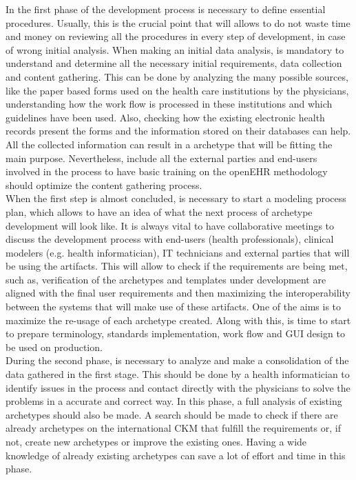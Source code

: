 \documentclass[mim_thesis.tex]{subfiles}
\begin{document}
In the first phase of the development process is necessary to define essential procedures. Usually, this is the crucial point that will allows to do not waste time and money on reviewing all the procedures in every step of development, in case of wrong initial analysis. When making an initial data analysis, is mandatory to understand and determine all the necessary initial requirements, data collection and content gathering. This can be done by analyzing the many possible sources, like the paper based forms used on the health care institutions by the physicians, understanding how the work flow is processed in these institutions and which guidelines have been used. Also, checking how the existing electronic health records present the forms and the information stored on their databases can help. All the collected information can result in a archetype that will be fitting the main purpose. Nevertheless, include all the external parties and end-users involved in the process to have basic training on the openEHR methodology should optimize the content gathering process.\\
  
When the first step is almost concluded, is necessary to start a modeling process plan, which allows to have an idea of what the next process of archetype development will look like. It is always vital to have collaborative meetings to discuss the development process with end-users (health professionals), clinical modelers (e.g. health informatician), IT technicians and external parties that will be using the artifacts. This will allow to check if the requirements are being met, such as, verification of the archetypes and templates under development are aligned with the final user requirements and then maximizing the interoperability between the systems that will make use of these artifacts. One of the aims is to maximize the re-usage of each archetype created. Along with this, is time to start to prepare terminology, standards implementation, work flow and \ac{GUI} design to be used on production. \\

During the second phase, is necessary to analyze and make a consolidation of the data gathered in the first stage. This should be done by a health informatician to identify issues in the process and contact directly with the physicians to solve the problems in a accurate and correct way. In this phase, a full analysis of existing archetypes should also be made. A search should be made to check if there are already archetypes on the international CKM that fulfill the requirements or, if not, create new archetypes or improve the existing ones. Having a wide knowledge of already existing archetypes can save a lot of effort and time in this phase. \\
\end{document}
